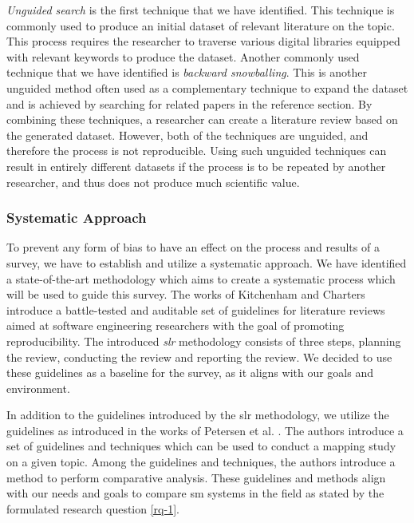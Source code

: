 

\textit{Unguided search} is the first technique that we have identified. This technique is commonly used to produce an initial dataset of relevant literature on the topic. This process requires the researcher to traverse various digital libraries equipped with relevant keywords to produce the dataset. Another commonly used technique that we have identified is \textit{backward snowballing}. This is another unguided method often used as a complementary technique to expand the dataset and is achieved by searching for related papers in the reference section. By combining these techniques, a researcher can create a literature review based on the generated dataset. However, both of the techniques are unguided, and therefore the process is not reproducible. Using such unguided techniques can result in entirely different datasets if the process is to be repeated by another researcher, and thus does not produce much scientific value. 

\subsubsection{Systematic Approach}
\label{sec:survey:methodology:strategy:systematic}

To prevent any form of bias to have an effect on the process and results of a survey, we have to establish and utilize a systematic approach. We have identified a state-of-the-art methodology which aims to create a systematic process which will be used to guide this survey. The works of Kitchenham and Charters \cite{Kitchenham2007} introduce a battle-tested and auditable set of guidelines for literature reviews aimed at software engineering researchers  with the goal of promoting reproducibility. The introduced \textit{\gls{slr}} methodology consists of three steps, planning the review, conducting the review and reporting the review. We decided to use these guidelines as a baseline for the survey, as it aligns with our goals and environment.

In addition to the guidelines introduced by the \gls{slr} methodology, we utilize the guidelines as introduced in the works of Petersen et al. \cite{Petersen2008, Petersen2015}. The authors introduce a set of guidelines and techniques which can be used to conduct a mapping study on a given topic. Among the guidelines and techniques, the authors introduce a method to perform comparative analysis. These guidelines and methods align with our needs and goals to compare \gls{sm} systems in the field as stated by the formulated research question \ref{rq-1}. 

